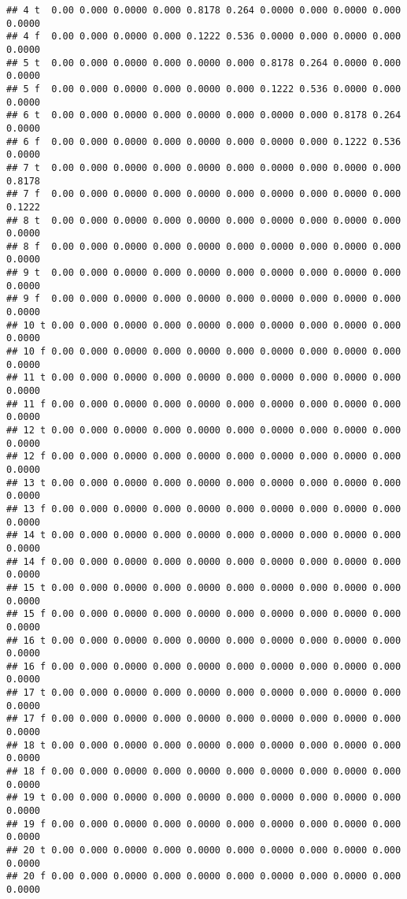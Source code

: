 \documentclass[]{article}
\begin{document}
\begin{verbatim}
## 4 t  0.00 0.000 0.0000 0.000 0.8178 0.264 0.0000 0.000 0.0000 0.000 0.0000
## 4 f  0.00 0.000 0.0000 0.000 0.1222 0.536 0.0000 0.000 0.0000 0.000 0.0000
## 5 t  0.00 0.000 0.0000 0.000 0.0000 0.000 0.8178 0.264 0.0000 0.000 0.0000
## 5 f  0.00 0.000 0.0000 0.000 0.0000 0.000 0.1222 0.536 0.0000 0.000 0.0000
## 6 t  0.00 0.000 0.0000 0.000 0.0000 0.000 0.0000 0.000 0.8178 0.264 0.0000
## 6 f  0.00 0.000 0.0000 0.000 0.0000 0.000 0.0000 0.000 0.1222 0.536 0.0000
## 7 t  0.00 0.000 0.0000 0.000 0.0000 0.000 0.0000 0.000 0.0000 0.000 0.8178
## 7 f  0.00 0.000 0.0000 0.000 0.0000 0.000 0.0000 0.000 0.0000 0.000 0.1222
## 8 t  0.00 0.000 0.0000 0.000 0.0000 0.000 0.0000 0.000 0.0000 0.000 0.0000
## 8 f  0.00 0.000 0.0000 0.000 0.0000 0.000 0.0000 0.000 0.0000 0.000 0.0000
## 9 t  0.00 0.000 0.0000 0.000 0.0000 0.000 0.0000 0.000 0.0000 0.000 0.0000
## 9 f  0.00 0.000 0.0000 0.000 0.0000 0.000 0.0000 0.000 0.0000 0.000 0.0000
## 10 t 0.00 0.000 0.0000 0.000 0.0000 0.000 0.0000 0.000 0.0000 0.000 0.0000
## 10 f 0.00 0.000 0.0000 0.000 0.0000 0.000 0.0000 0.000 0.0000 0.000 0.0000
## 11 t 0.00 0.000 0.0000 0.000 0.0000 0.000 0.0000 0.000 0.0000 0.000 0.0000
## 11 f 0.00 0.000 0.0000 0.000 0.0000 0.000 0.0000 0.000 0.0000 0.000 0.0000
## 12 t 0.00 0.000 0.0000 0.000 0.0000 0.000 0.0000 0.000 0.0000 0.000 0.0000
## 12 f 0.00 0.000 0.0000 0.000 0.0000 0.000 0.0000 0.000 0.0000 0.000 0.0000
## 13 t 0.00 0.000 0.0000 0.000 0.0000 0.000 0.0000 0.000 0.0000 0.000 0.0000
## 13 f 0.00 0.000 0.0000 0.000 0.0000 0.000 0.0000 0.000 0.0000 0.000 0.0000
## 14 t 0.00 0.000 0.0000 0.000 0.0000 0.000 0.0000 0.000 0.0000 0.000 0.0000
## 14 f 0.00 0.000 0.0000 0.000 0.0000 0.000 0.0000 0.000 0.0000 0.000 0.0000
## 15 t 0.00 0.000 0.0000 0.000 0.0000 0.000 0.0000 0.000 0.0000 0.000 0.0000
## 15 f 0.00 0.000 0.0000 0.000 0.0000 0.000 0.0000 0.000 0.0000 0.000 0.0000
## 16 t 0.00 0.000 0.0000 0.000 0.0000 0.000 0.0000 0.000 0.0000 0.000 0.0000
## 16 f 0.00 0.000 0.0000 0.000 0.0000 0.000 0.0000 0.000 0.0000 0.000 0.0000
## 17 t 0.00 0.000 0.0000 0.000 0.0000 0.000 0.0000 0.000 0.0000 0.000 0.0000
## 17 f 0.00 0.000 0.0000 0.000 0.0000 0.000 0.0000 0.000 0.0000 0.000 0.0000
## 18 t 0.00 0.000 0.0000 0.000 0.0000 0.000 0.0000 0.000 0.0000 0.000 0.0000
## 18 f 0.00 0.000 0.0000 0.000 0.0000 0.000 0.0000 0.000 0.0000 0.000 0.0000
## 19 t 0.00 0.000 0.0000 0.000 0.0000 0.000 0.0000 0.000 0.0000 0.000 0.0000
## 19 f 0.00 0.000 0.0000 0.000 0.0000 0.000 0.0000 0.000 0.0000 0.000 0.0000
## 20 t 0.00 0.000 0.0000 0.000 0.0000 0.000 0.0000 0.000 0.0000 0.000 0.0000
## 20 f 0.00 0.000 0.0000 0.000 0.0000 0.000 0.0000 0.000 0.0000 0.000 0.0000

\end{verbatim}
\end{document}

